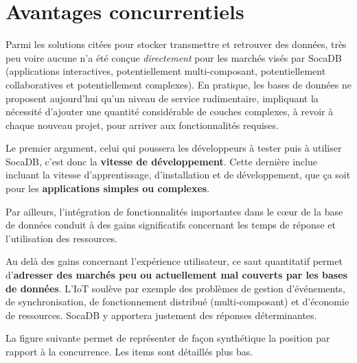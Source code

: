 \documentclass[a4paper,10pt]{scrreprt}
\begin{document}
        
    \section{Avantages concurrentiels}

        Parmi les solutions citées pour stocker transmettre et retrouver des données, très peu voire aucune n'a été conçue \textit{directement} pour les marchés visés par SocaDB (applications interactives, potentiellement multi-composant, potentiellement collaboratives et potentiellement complexes). En pratique, les bases de données ne proposent aujourd'hui qu'un niveau de service rudimentaire, impliquant la nécessité d'ajouter une quantité considérable de couches complexes, à revoir à chaque nouveau projet, pour arriver aux fonctionnalités requises.
        
        Le premier argument, celui qui poussera les développeurs à tester puis à utiliser SocaDB, c'est donc la \textbf{vitesse de développement}. Cette dernière inclue incluant la vitesse d'apprentissage, d'installation et de développement, que ça soit pour les \textbf{applications simples ou complexes}.
        
        \medskip
        Par ailleurs, l'intégration de fonctionnalités importantes dans le c\oe{}ur de la base de données conduit à des gains significatifs concernant les temps de réponse et l'utilisation des ressources.
        
        Au delà des gains concernant l'expérience utilisateur, ce saut quantitatif permet d'\textbf{adresser des marchés peu ou actuellement mal couverts par les bases de données}. L'IoT soulève par exemple des problèmes de gestion d'événements, de synchronisation, de fonctionnement distribué (multi-composant) et d'économie de ressources. SocaDB y apportera justement des réponses déterminantes.
        
        \medskip
        La figure suivante permet de représenter de façon synthétique la position par rapport à la concurrence. Les items sont détaillés plus bas.
        
\end{document}
